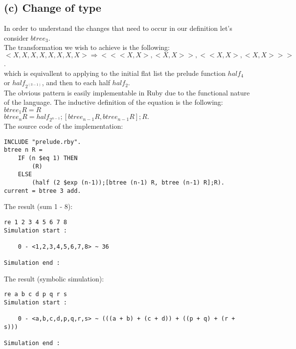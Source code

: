 \documentclass[a4paper,10pt]{article}
\begin{document}
\subsection*{(c) Change of type}
In order to understand the changes that need to occur in our definition let's consider $btree_3$. \\[0.5cm]
The transformation we wish to achieve is the following: \\[0.25cm]
$<X,X,X,X,X,X,X,X> \Rightarrow <<<X,X>,<X,X>>,<<X,X>,<X,X>>>$. \\[0.25cm]
which is equivallent to applying to the initial flat list the prelude function $half_4$ or $half_{2^(3-1)}$, and then to each half $half_2$. \\[0.25cm]
The obvious pattern is easily implementable in Ruby due to the functional nature of the language. The inductive definition of the equation is the following:
\\[0.5cm]
$btree_1 R = R$ \\[0.25cm]
$btree_n R = half_{2^{n-1}};[btree_{n-1} R, btree_{n-1} R];R.$ \\[0.25cm]
The source code of the implementation:
\begin{Verbatim}
INCLUDE "prelude.rby".
btree n R =
	IF (n $eq 1) THEN
		(R)
	ELSE
		(half (2 $exp (n-1));[btree (n-1) R, btree (n-1) R];R).
current = btree 3 add.
\end{Verbatim}
The result (sum 1 - 8):
\begin{Verbatim}
re 1 2 3 4 5 6 7 8
Simulation start :

    0 - <1,2,3,4,5,6,7,8> ~ 36

Simulation end :
\end{Verbatim}
The result (symbolic simulation):
\begin{Verbatim}
re a b c d p q r s
Simulation start :

    0 - <a,b,c,d,p,q,r,s> ~ (((a + b) + (c + d)) + ((p + q) + (r + s)))

Simulation end :
\end{Verbatim}
\end{document}
